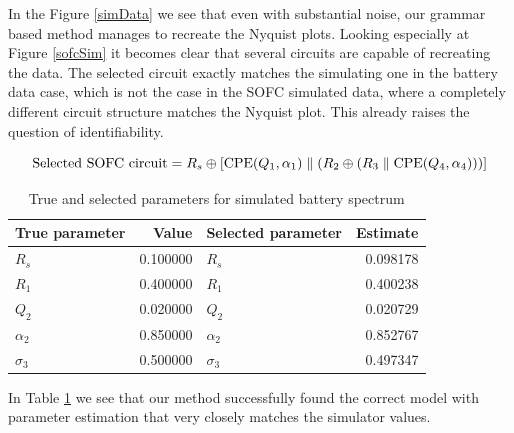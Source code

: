 \documentclass[
    11pt,
    a4paper,
    oneside
]{article}
\newcommand{\seriesconn}{\mathbin{\oplus}}
\newcommand{\CPEel}[2]{\mathrm{CPE}\!\left(#1,#2\right)}
\begin{document}
In the Figure \ref{simData} we see that even with substantial noise, our grammar based method manages to recreate the Nyquist plots. Looking especially
at Figure \ref{sofcSim} it becomes clear that several circuits are capable of recreating the data. The selected circuit exactly matches the simulating one 
in the battery data case, which is not the case in the SOFC simulated data, where a completely different circuit structure matches the Nyquist plot. This already
raises the question of identifiability.


\[
\textnormal{Selected SOFC circuit}
    = R_s
    \seriesconn
    \left[
    \CPEel{Q_1}{\alpha_1}
    \parallel
    \left(
        R_2
        \seriesconn
        \left(
            R_3
            \parallel
            \CPEel{Q_4}{\alpha_4}
        \right)
    \right)
    \right]
\]

\begin{table}[htbp]
\centering
\caption{True and selected parameters for simulated battery spectrum}
\label{tab:sim006-parameters}
\begin{tabular}{@{}lrlr@{}}
\toprule
\textbf{True parameter} & \textbf{Value}
& \textbf{Selected parameter} & \textbf{Estimate} \\
\midrule
$R_s$       & 0.100000 & $R_s$         & 0.098178 \\
$R_1$       & 0.400000 & $R_1$         & 0.400238 \\
$Q_2$       & 0.020000 & $Q_2$         & 0.020729 \\
$\alpha_2$  & 0.850000 & $\alpha_2$    & 0.852767 \\
$\sigma_3$    & 0.500000 & $\sigma_3$    & 0.497347 \\
\bottomrule
\end{tabular}
\end{table}

In Table \ref{tab:sim006-parameters} we see that our method successfully found the correct model with parameter estimation that very closely
matches the simulator values.
\end{document}
